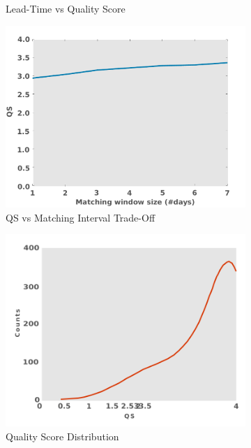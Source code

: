 \documentclass[letterpaper]{article}
\begin{document}
\begin{figure}
\begin{subfigure}{0.33\columnwidth}
  \caption{\scriptsize Lead-Time vs Quality Score}
  \label{fig:leadTimeVsQS}
\end{subfigure}

\begin{subfigure}{0.33\columnwidth}
    \centering
  \includegraphics[width=0.85\columnwidth]{matchingwindow}
  \caption{\scriptsize QS vs Matching Interval Trade-Off}
  \label{fig:matchinginterval}
\end{subfigure}%
\begin{subfigure}{0.33\columnwidth}
    \centering
  \includegraphics[width=0.85\columnwidth]{doubleHump_new3}
  \caption{\scriptsize Quality Score Distribution}
  \label{fig:doubleHump}
\end{subfigure}%
\begin{subfigure}{0.33\columnwidth}
    \centering

\end{subfigure}
\end{figure}
\end{document}
